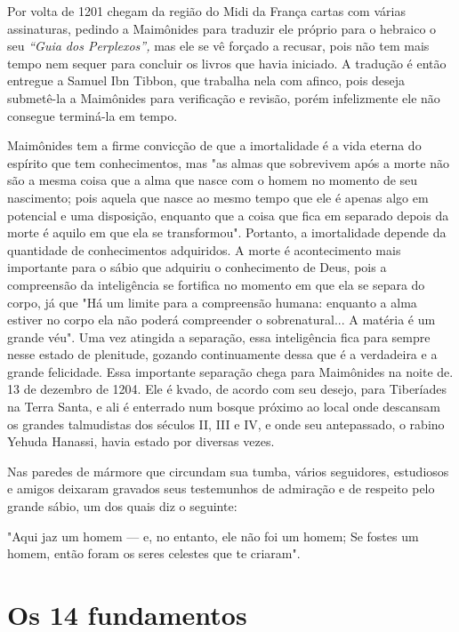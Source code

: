 Por volta de 1201 chegam da região do Midi da França cartas com várias
assinaturas, pedindo a Maimônides para traduzir ele próprio para o
he­braico o seu \emph{``Guia dos Perplexos'',} mas ele se vê forçado a
recusar, pois não tem mais tempo nem sequer para concluir os livros que
havia iniciado. A tradu­ção é então entregue a Samuel Ibn Tibbon, que
trabalha nela com afinco, pois deseja submetê-la a Maimônides para
verificação e revisão, porém infelizmente ele não consegue terminá-la em
tempo.

Maimônides tem a firme convicção de que a imortalidade é a vida eterna
do espírito que tem conhecimentos, mas "as almas que sobrevivem após a
morte não são a mesma coisa que a alma que nasce com o homem no mo­mento
de seu nascimento; pois aquela que nasce ao mesmo tempo que ele é apenas
algo em potencial e uma disposição, enquanto que a coisa que fica em
separado depois da morte é aquilo em que ela se transformou". Portanto,
a imor­talidade depende da quantidade de conhecimentos adquiridos. A
morte é acon­tecimento mais importante para o sábio que adquiriu o
conhecimento de Deus, pois a compreensão da inteligência se fortifica no
momento em que ela se sepa­ra do corpo, já que "Há um limite para a
compreensão humana: enquanto a alma estiver no corpo ela não poderá
compreender o sobrenatural... A matéria é um grande véu". Uma vez
atingida a separação, essa inteligência fica para sem­pre nesse estado
de plenitude, gozando continuamente dessa que é a verdadei­ra e a grande
felicidade.
Essa importante separação chega para Maimônides na noite
de. 13 de dezembro de 1204. Ele é kvado, de acordo com
seu desejo, para Tiberíades na Terra Santa, e ali é enterrado num bosque
próximo ao local onde descan­sam os grandes talmudistas dos séculos II,
III e IV, e onde seu antepassado, o rabino Yehuda Hanassi, havia estado
por diversas vezes.

Nas paredes de mármore que circundam sua tumba, vários seguido­res,
estudiosos e amigos deixaram gravados seus testemunhos de admiração e de
respeito pelo grande sábio, um dos quais diz o seguinte:

"Aqui jaz um homem --- e, no entanto, ele não foi um homem; Se fostes um
homem, então foram os seres celestes que te criaram".




\chapter{Os 14 fundamentos}

